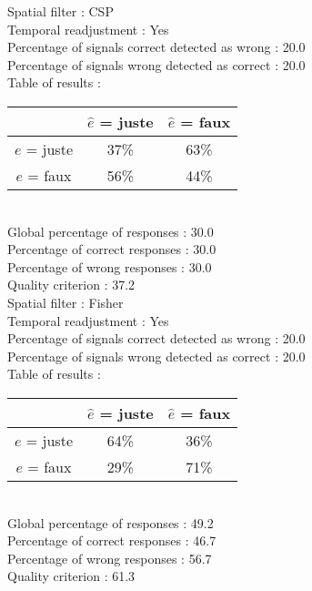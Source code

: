 Spatial filter : CSP \\
Temporal readjustment : Yes \\
Percentage of signals correct detected as wrong :   20.0 \\
Percentage of signals wrong detected as correct :   20.0 \\
Table of results : \\
\begin{tabular}{|c|c|c|}
\hline				& $\hat{e}$ = juste & $\hat{e}$ = faux \\
\hline  $e$ = juste	&     37\%			&     63\%		\\
\hline  $e$ = faux	&     56\%			&     44\%		\\
\hline
\end{tabular}\\
Global percentage of responses :   30.0 \\
Percentage of correct responses :   30.0 \\
Percentage of wrong responses :   30.0 \\
Quality criterion :   37.2 \\

Spatial filter : Fisher \\
Temporal readjustment : Yes \\
Percentage of signals correct detected as wrong :   20.0 \\
Percentage of signals wrong detected as correct :   20.0 \\
Table of results : \\
\begin{tabular}{|c|c|c|}
\hline				& $\hat{e}$ = juste & $\hat{e}$ = faux \\
\hline  $e$ = juste	&     64\%			&     36\%		\\
\hline  $e$ = faux	&     29\%			&     71\%		\\
\hline
\end{tabular}\\
Global percentage of responses :   49.2 \\
Percentage of correct responses :   46.7 \\
Percentage of wrong responses :   56.7 \\
Quality criterion :   61.3 \\

